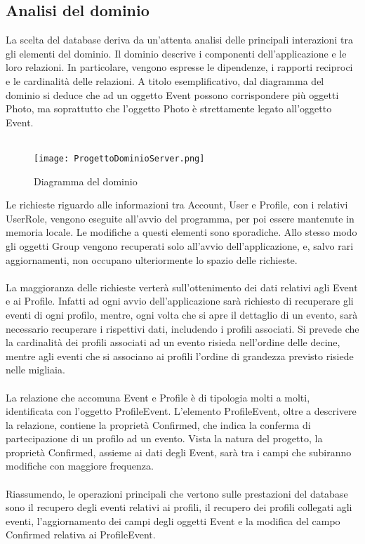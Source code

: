 \subsection{Analisi del dominio}

La scelta del database deriva da un’attenta analisi delle principali interazioni tra gli elementi del dominio. 
Il dominio descrive i componenti dell’applicazione e le loro relazioni. 
In particolare, vengono espresse le dipendenze, i rapporti reciproci e le cardinalità delle relazioni. 
A titolo esemplificativo, dal diagramma del dominio si deduce che ad un oggetto Event possono corrispondere più oggetti Photo, 
ma soprattutto che l’oggetto Photo è strettamente legato all’oggetto Event.\\
\\
\begin{figure}[h!]
    \centering
    \texttt{[image: ProgettoDominioServer.png]}
    \caption{Diagramma del dominio}
\end{figure}
Le richieste riguardo alle informazioni tra Account, User e Profile, con i relativi UserRole, vengono eseguite all’avvio del programma, per poi essere mantenute in memoria locale. 
Le modifiche a questi elementi sono sporadiche.
Allo stesso modo gli oggetti Group vengono recuperati solo all’avvio dell’applicazione, e, salvo rari aggiornamenti, non occupano ulteriormente lo spazio delle richieste.\\
\\
La maggioranza delle richieste verterà sull’ottenimento dei dati relativi agli Event e ai Profile. 
Infatti ad ogni avvio dell’applicazione sarà richiesto di recuperare gli eventi di ogni profilo, mentre, ogni volta che si apre il dettaglio di un evento, 
sarà necessario recuperare i rispettivi dati, includendo i profili associati. 
Si prevede che la cardinalità dei profili associati ad un evento risieda nell’ordine delle decine, 
mentre agli eventi che si associano ai profili l’ordine di grandezza previsto risiede nelle migliaia. \\
\\

La relazione che accomuna Event e Profile è di tipologia molti a molti, identificata con l’oggetto ProfileEvent. 
L’elemento ProfileEvent, oltre a descrivere la relazione, contiene la proprietà Confirmed, che indica la conferma di partecipazione di un profilo ad un evento. 
Vista la natura del progetto, la proprietà Confirmed, assieme ai dati degli Event, sarà tra i campi che subiranno modifiche con maggiore frequenza.\\
\\
Riassumendo, le operazioni principali che vertono sulle prestazioni del database sono il recupero degli eventi relativi ai profili, il recupero dei profili collegati agli eventi, 
l’aggiornamento dei campi degli oggetti Event e la modifica del campo Confirmed relativa ai ProfileEvent.\\
\\

